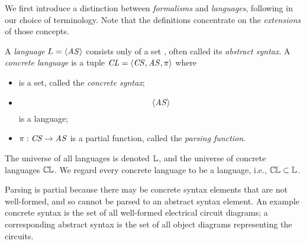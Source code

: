 \begin{newdef}
We first introduce a distinction between \emph{formalisms} and \emph{languages}, following \cite{} in our choice of terminology. Note that the definitions concentrate on the \emph{extensions} of those concepts.

\begin{Definition}
A \emph{language} $L=\langle{\ensuremath{\mathit{AS}}}\rangle$ consists only of a set \AS, often called its \emph{abstract syntax}. 
A \emph{concrete language} is a tuple $\mathit{CL}=\langle{\ensuremath{\mathit{CS}},\ensuremath{\mathit{AS}},\ensuremath{\pi}}\rangle$ where
\begin{itemize}
\item \CS is a set, called the \emph{concrete syntax};
\item $$\langle{\ensuremath{\mathit{AS}}}\rangle$$ is a language;
\item $\pi:\mathit{CS}\rightarrow\mathit{AS}$ is a partial function, called the \emph{parsing function}.
\end{itemize}
The universe of all languages is denoted $\mathbb{L}$, and the universe of concrete languages $\mathbb{C\mskip-1mu L}$. We regard every concrete language to be a language, i.e., $\mathbb{C\mskip-1mu L}\subset\mathbb{L}$.
\end{Definition}
%
Parsing is partial because there may be concrete syntax elements that are not well-formed, and so cannot be parsed to an abstract syntax element. An example concrete syntax is the set of all well-formed electrical circuit diagrams; a corresponding abstract syntax is the set of all object diagrams representing the circuits.
%



\end{newdef}
